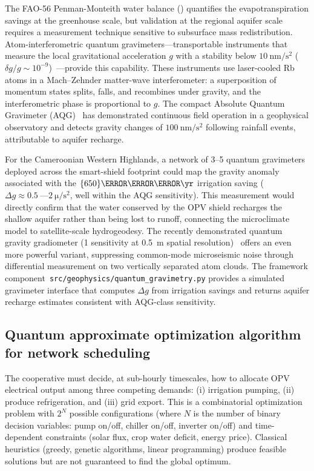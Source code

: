 \documentclass[11pt,a4paper]{article}
\begin{document}
The FAO-56 Penman-Monteith water balance ()
quantifies the evapotranspiration savings at the greenhouse scale, but
validation at the regional aquifer scale requires a measurement technique
sensitive to subsurface mass redistribution. Atom-interferometric quantum
gravimeters---transportable instruments that measure the local gravitational
acceleration $g$ with a stability below $\qty{10}{\nm\per\s\squared}$
($\delta g/g \sim 10^{-9}$)~\cite{Menoret2018}---provide this capability.
These instruments use laser-cooled Rb atoms in a Mach--Zehnder
matter-wave interferometer: a superposition of momentum states splits, falls,
and recombines under gravity, and the interferometric phase is proportional to
$g$. The compact Absolute Quantum Gravimeter (AQG)~\cite{Menoret2018} has
demonstrated continuous field operation in a geophysical observatory and detects
gravity changes of $\qty{100}{\nm\per\s\squared}$ following rainfall events,
attributable to aquifer recharge.

For the Cameroonian Western Highlands, a network of 3--5 quantum gravimeters
deployed across the smart-shield footprint could map the gravity anomaly
associated with the $\qty{650}{\m\cubed\per\yr}$ irrigation saving
($\Delta g \approx \qty{0.5}{\text{---}}\qty{2}{\micro\per\s\squared}$,
well within the AQG sensitivity). This measurement would directly confirm that
the water conserved by the OPV shield recharges the shallow aquifer rather
than being lost to runoff, connecting the microclimate model to satellite-scale
hydrogeodesy. The recently demonstrated quantum gravity gradiometer (\qty{1}{}
sensitivity at \qty{0.5}{\m} spatial resolution)~\cite{Stray2022} offers an even
more powerful variant, suppressing common-mode microseismic noise through
differential measurement on two vertically separated atom clouds.
The framework component~\texttt{src/geophysics/quantum\_gravimetry.py} provides
a simulated gravimeter interface that computes $\Delta g$ from irrigation
savings and returns aquifer recharge estimates consistent with AQG-class
sensitivity.

\subsection{Quantum approximate optimization algorithm for network scheduling}
\label{SI-sec:qaoa}

The cooperative must decide, at sub-hourly timescales, how to allocate OPV
electrical output among three competing demands: (i) irrigation pumping,
(ii) produce refrigeration, and (iii) grid export. This is a
combinatorial optimization problem with $2^N$ possible configurations
(where $N$ is the number of binary decision variables: pump on/off, chiller
on/off, inverter on/off) and time-dependent constraints (solar flux, crop
water deficit, energy price). Classical heuristics (greedy, genetic algorithms,
linear programming) produce feasible solutions but are not guaranteed to find
the global optimum.
\end{document}
